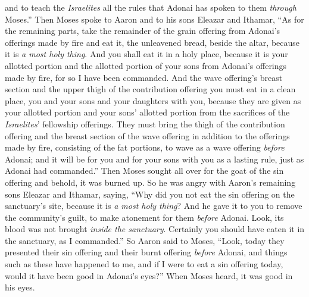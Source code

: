 \begin{biblechapter}
\verse and to teach the \textit{Israelites} all the rules that Adonai has spoken to them \textit{through} Moses.”
\verse Then Moses spoke to Aaron and to his sons Eleazar and Ithamar, “As for the remaining parts, take the remainder of the grain offering from Adonai’s offerings made by fire and eat it, the unleavened bread, beside the altar, because it is \textit{a most holy thing}.
\verse And you shall eat it in a holy place, because it is your allotted portion and the allotted portion of your sons from Adonai’s offerings made by fire, for so I have been commanded.
\verse And the wave offering’s breast section and the upper thigh of the contribution offering you must eat in a clean place, you and your sons and your daughters with you, because they are given as your allotted portion and your sons’ allotted portion from the sacrifices of the \textit{Israelites}’ fellowship offerings.
\verse They must bring the thigh of the contribution offering and the breast section of the wave offering in addition to the offerings made by fire, consisting of the fat portions, to wave as a wave offering \textit{before} Adonai; and it will be for you and for your sons with you as a lasting rule, just as Adonai had commanded.”
 Then Moses sought all over for the goat of the sin offering and behold, it was burned up. So he was angry with Aaron’s remaining sons Eleazar and Ithamar, saying,
\verse “Why did you not eat the sin offering on the sanctuary’s site, because it is \textit{a most holy thing}? And he gave it to you to remove the community’s guilt, to make atonement for them \textit{before} Adonai.
\verse Look, its blood was not brought \textit{inside the sanctuary}. Certainly you should have eaten it in the sanctuary, as I commanded.”
\verse So Aaron said to Moses, “Look, today they presented their sin offering and their burnt offering \textit{before} Adonai, and things such as these have happened to me, and if I were to eat a sin offering today, would it have been good in Adonai’s eyes?”
\verse When Moses heard, it was good in his eyes.
\end{biblechapter}

